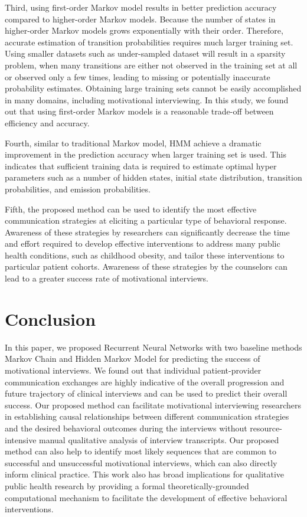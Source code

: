 \documentclass{amia_summit_2018}
\begin{document}
Third, using first-order Markov model results in better prediction accuracy compared to higher-order Markov models. Because the number of states in higher-order Markov models grows exponentially with their order. Therefore, accurate estimation of transition probabilities requires much larger training set. Using smaller datasets such as under-sampled dataset will result in a sparsity problem, when many transitions are either not observed in the training set at all or observed only a few times, leading to missing or potentially inaccurate probability estimates. Obtaining large training sets cannot be easily accomplished in many domains, including motivational interviewing. In this study, we found out that using first-order Markov models is a reasonable trade-off between efficiency and accuracy.  

Fourth, similar to traditional Markov model, HMM achieve a dramatic improvement in the prediction accuracy when larger training set is used. This indicates that sufficient training data is required to estimate optimal hyper parameters such as a number of hidden states, initial state distribution, transition probabilities, and emission probabilities.   
 
Fifth, the proposed method can be used to identify the most effective communication strategies at eliciting a particular type of behavioral response. Awareness of these strategies by researchers can significantly decrease the time and effort required to develop effective interventions to address many public health conditions, such as childhood obesity, and tailor these interventions to particular patient cohorts. Awareness of these strategies by the counselors can lead to a greater success rate of motivational interviews.     
 
\section*{Conclusion}
In this paper, we proposed Recurrent Neural Networks with two baseline methods Markov Chain and Hidden Markov Model for predicting the success of motivational interviews. We found out that individual patient-provider communication exchanges are highly indicative of the overall progression and future trajectory of clinical interviews and can be used to predict their overall success. Our proposed method can facilitate motivational interviewing researchers in establishing causal relationships between different communication strategies and the desired behavioral outcomes during the interviews without resource-intensive manual qualitative analysis of interview transcripts. Our proposed method can also help to identify most likely sequences that are common to successful and unsuccessful motivational interviews, which can also directly inform clinical practice. This work also has broad implications for qualitative public health research by providing a formal theoretically-grounded computational mechanism to facilitate the development of effective behavioral interventions.
\end{document}
